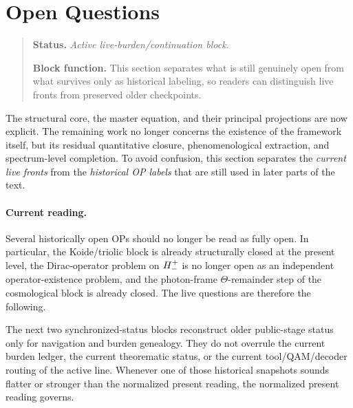 \section*{Open Questions}
\begin{quote}\small
\noindent\textbf{Status.} \emph{Active live-burden/continuation block.}\par
\noindent\textbf{Block function.} This section separates what is still genuinely open from what survives only as historical labeling, so readers can distinguish live fronts from preserved older checkpoints.
\end{quote}

The structural core, the master equation, and their principal projections are
now explicit. The remaining work no longer concerns the existence of the
framework itself, but its residual quantitative closure, phenomenological
extraction, and spectrum-level completion. To avoid confusion, this section
separates the \emph{current live fronts} from the \emph{historical OP labels}
that are still used in later parts of the text.

\paragraph{Current reading.}
Several historically open OPs should no longer be read as fully open. In
particular, the Koide/triolic block is already structurally closed at the
present level, the Dirac-operator problem on $H^+_-$ is no longer open as
an independent operator-existence problem, and the photon-frame
$\Theta$-remainder step of the cosmological block is already closed. The live
questions are therefore the following.

\begin{remark}
The next two synchronized-status blocks reconstruct older public-stage status only for navigation and burden genealogy. They do not overrule the current burden ledger, the current theorematic status, or the current tool/QAM/decoder routing of the active line. Whenever one of those historical snapshots sounds flatter or stronger than the normalized present reading, the normalized present reading governs.
\end{remark}

